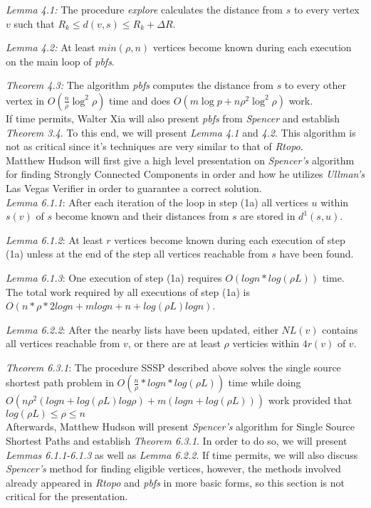 \documentclass[paper=a4, fontsize=11pt]{scrartcl} %
\numberwithin{equation}{section} %
\numberwithin{figure}{section} %
\numberwithin{table}{section} %
\begin{document}
\textit{Lemma 4.1:} The procedure \textit{explore} calculates the distance from $s$ to every vertex $v$ such that $R_k \leq d(v,s) \leq R_k + \Delta{R}$.

\textit{Lemma 4.2:} At least $min(\rho,n)$ vertices become known during each execution on the main loop of \textit{pbfs}.

\textit{Theorem 4.3:} The algorithm \textit{pbfs} computes the distance from $s$ to every other vertex in $O(\frac{n}{\rho}\log^2{\rho})$ time and does $O(m\log{p} + n\rho^2\log^2{\rho})$ work.\\

If time permits, Walter Xia will also present \textit{pbfs} from \textit{Spencer\cite{S97}} and establish \textit{Theorem 3.4}. To this end, we will present \textit{Lemma 4.1} and \textit{4.2}. This algorithm is not as critical since it's techniques are very similar to that of \textit{Rtopo}.\\

Matthew Hudson will first give a high level presentation on \textit{Spencer's\cite{S97}} algorithm for finding Strongly Connected Components in order and how he utilizes \textit{Ullman's\cite{UY91}} Las Vegas Verifier in order to guarantee a correct solution.\\

\textit{Lemma 6.1.1}: After each iteration of the loop in step (1a) all vertices $u$ within
$s(v)$ of $s$ become known and their distances from $s$ are stored in $d^1(s, u)$.

\textit{Lemma 6.1.2}: At least $r$ vertices become known during each execution of step
(1a) unless at the end of the step all vertices reachable from $s$ have been found.

\textit{Lemma 6.1.3}: One execution of step (1a) requires $O(logn*log(\rho{}L))$ time. The
total work required by all executions of step (1a) is $O(n*\rho*2logn+mlogn+n+log(\rho{}L)logn)$.

\textit{Lemma 6.2.2}: After the nearby lists have been updated, either $NL(v)$ contains all vertices reachable from $v$, or there are at least $\rho$ verticies within $4r(v)$ of $v$.

\textit{Theorem 6.3.1}: The procedure SSSP described above solves the single source shortest path problem in $O(\frac{n}{\rho{}}*logn*log(\rho{}L))$ time while doing $O(n\rho{}^2(logn+log(\rho{}L)log\rho{})+m(logn+log(\rho{}L)))$ work provided that $log(\rho{}L)\le \rho{}\le n$\\

Afterwards, Matthew Hudson will present \textit{Spencer's\cite{S97}} algorithm for Single Source Shortest Paths and establish \textit{Theorem 6.3.1}. In order to do so, we will present \textit{Lemmas 6.1.1-6.1.3} as well as \textit{Lemma 6.2.2}. If time permits, we will also discuss \textit{Spencer's\cite{S97}} method for finding eligible vertices, however, the methods involved already appeared in \textit{Rtopo} and \textit{pbfs} in more basic forms, so this section is not critical for the presentation.
\end{document}
